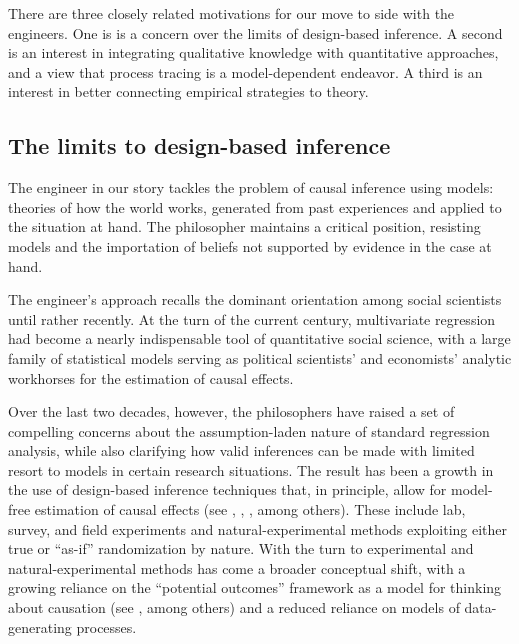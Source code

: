 \documentclass[
  12pt,
]{book}
\begin{document}
There are three closely related motivations for our move to side with the engineers. One is is a concern over the limits of design-based inference. A second is an interest in integrating qualitative knowledge with quantitative approaches, and a view that process tracing is a model-dependent endeavor. A third is an interest in better connecting empirical strategies to theory.

\hypertarget{the-limits-to-design-based-inference}{%
\subsection{The limits to design-based inference}\label{the-limits-to-design-based-inference}}

The engineer in our story tackles the problem of causal inference using models: theories of how the world works, generated from past experiences and applied to the situation at hand. The philosopher maintains a critical position, resisting models and the importation of beliefs not supported by evidence in the case at hand.

The engineer's approach recalls the dominant orientation among social scientists until rather recently. At the turn of the current century, multivariate regression had become a nearly indispensable tool of quantitative social science, with a large family of statistical models serving as political scientists' and economists' analytic workhorses for the estimation of causal effects.

Over the last two decades, however, the philosophers have raised a set of compelling concerns about the assumption-laden nature of standard regression analysis, while also clarifying how valid inferences can be made with limited resort to models in certain research situations. The result has been a growth in the use of design-based inference techniques that, in principle, allow for model-free estimation of causal effects (see \citet{dunning2012natural}, \citet{GerGreKap04}, \citet{druckman2011experimentation}, \citet{palfrey2009laboratory} among others). These include lab, survey, and field experiments and natural-experimental methods exploiting either true or ``as-if'' randomization by nature. With the turn to experimental and natural-experimental methods has come a broader conceptual shift, with a growing reliance on the ``potential outcomes'' framework as a model for thinking about causation (see \citet{Rubin1974}, \citet{splawa1990application} among others) and a reduced reliance on models of data-generating processes.
\end{document}
